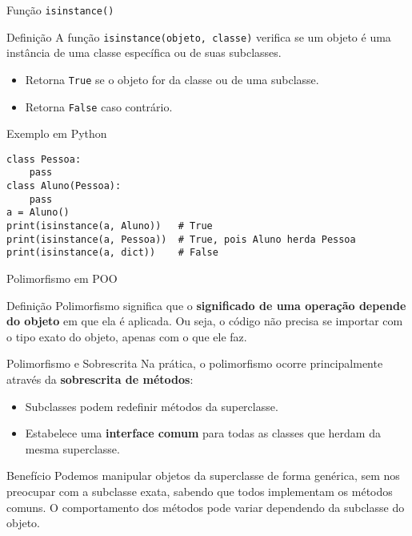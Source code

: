 \begin{frame}[fragile]{Função \texttt{isinstance()}}

\begin{block}{Definição}
A função \texttt{isinstance(objeto, classe)} verifica se um objeto é uma instância de uma classe específica ou de suas subclasses.

\begin{itemize}
    \item Retorna \texttt{True} se o objeto for da classe ou de uma subclasse.
    \item Retorna \texttt{False} caso contrário.
\end{itemize}
\end{block}

\begin{exampleblock}{Exemplo em Python}
\begin{verbatim}
class Pessoa:
    pass
class Aluno(Pessoa):
    pass
a = Aluno()
print(isinstance(a, Aluno))   # True
print(isinstance(a, Pessoa))  # True, pois Aluno herda Pessoa
print(isinstance(a, dict))    # False
\end{verbatim}
\end{exampleblock}

\end{frame}

\begin{frame}{Polimorfismo em POO}

\begin{block}{Definição}
Polimorfismo significa que o \textbf{significado de uma operação depende do objeto} em que ela é aplicada.  
Ou seja, o código não precisa se importar com o tipo exato do objeto, apenas com o que ele faz.
\end{block}

\begin{block}{Polimorfismo e Sobrescrita}
Na prática, o polimorfismo ocorre principalmente através da \textbf{sobrescrita de métodos}:

\begin{itemize}
    \item Subclasses podem redefinir métodos da superclasse.
    \item Estabelece uma \textbf{interface comum} para todas as classes que herdam da mesma superclasse.
\end{itemize}
\end{block}

\begin{block}{Benefício}
Podemos manipular objetos da superclasse de forma genérica, sem nos preocupar com a subclasse exata, sabendo que todos implementam os métodos comuns.  
O comportamento dos métodos pode variar dependendo da subclasse do objeto.
\end{block}

\end{frame}


